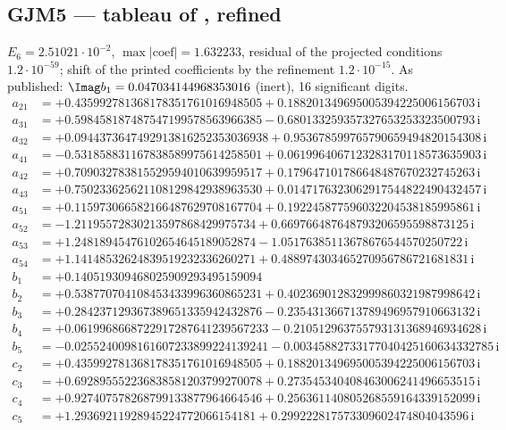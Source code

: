\subsection*{GJM5 --- tableau of \cite[Table~4]{GJM}, refined}
$E_{6}=2.51021\cdot10^{-2}$, $\max|\text{coef}|=1.632233$, residual of the projected conditions $1.2\cdot10^{-59}$; shift of the printed coefficients by the refinement $1.2\cdot10^{-15}$. As published: $\Imag b_1=0.047034144968353016$ (inert), 16 significant digits.
{\small
\begin{align*}
a_{21} &= +0.435992781368178351761016948505 + 0.188201349695005394225006156703\,\mathrm{i}\\
a_{31} &= +0.598458187487547199578563966385 - 0.680133259357327653253323500793\,\mathrm{i}\\
a_{32} &= +0.0944373647492913816252353036938 + 0.953678599765790659494820154308\,\mathrm{i}\\
a_{41} &= -0.531858831167838589975614258501 + 0.0619964067123283170118573635903\,\mathrm{i}\\
a_{42} &= +0.709032783815529594010639959517 + 0.179647101786648487670232745263\,\mathrm{i}\\
a_{43} &= +0.750233625621108129842938963530 + 0.0147176323062917544822490432457\,\mathrm{i}\\
a_{51} &= +0.115973066582166487629708167704 + 0.192245877596032204538185995861\,\mathrm{i}\\
a_{52} &= -1.21195572830213597868429975734 + 0.669766487648793206595598873125\,\mathrm{i}\\
a_{53} &= +1.24818945476102654645189052874 - 1.05176385113678676544570250722\,\mathrm{i}\\
a_{54} &= +1.14148532624839519232336260271 + 0.488974303465270956786721681831\,\mathrm{i}\\[1mm]
b_{1} &= +0.140519309468025909293495159094\\
b_{2} &= +0.538770704108453433996360865231 + 0.402369012832999860321987998642\,\mathrm{i}\\
b_{3} &= +0.284237129367389651335942432876 - 0.235431366713789496957910663132\,\mathrm{i}\\
b_{4} &= +0.0619968668722917287641239567233 - 0.210512963755793131368946934628\,\mathrm{i}\\
b_{5} &= -0.0255240098161607233899224139241 - 0.00345882733177040425160634332785\,\mathrm{i}\\[1mm]
c_{2} &= +0.435992781368178351761016948505 + 0.188201349695005394225006156703\,\mathrm{i}\\
c_{3} &= +0.692895552236838581203799270078 + 0.273545340408463006241496653515\,\mathrm{i}\\
c_{4} &= +0.927407578268799133877964664546 + 0.256361140805268559164339152099\,\mathrm{i}\\
c_{5} &= +1.29369211928945224772066154181 + 0.299222817573309602474804043596\,\mathrm{i}
\end{align*}
}

